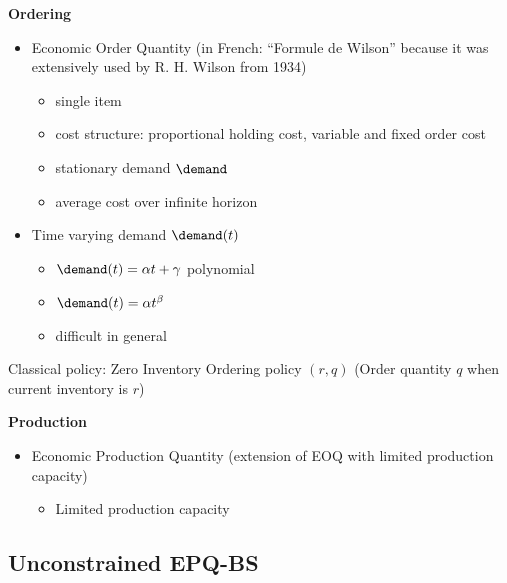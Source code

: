 \medskip

\textbf{Ordering}

\begin{itemize}
  \item \cite{Harris1913} Economic Order Quantity (in French: ``Formule de Wilson'' because it was extensively used by R. H. Wilson from 1934)
  \begin{itemize}
    \item single item
    \item cost structure: proportional holding cost, variable and fixed order cost
    \item stationary demand $\demand$
    \item average cost over infinite horizon
  \end{itemize}
  \item Time varying demand $\demand(t)$
  \begin{itemize}
    \item \cite{Resh1976,Donaldson1977} $\demand(t)=\alpha t+\gamma$ polynomial
    \item \cite{Barbosa1978} $\demand(t)=\alpha t^{\beta}$
    \item difficult in general
  \end{itemize}
\end{itemize}

Classical policy: Zero Inventory Ordering policy $(r,q)$ (Order quantity $q$ when current inventory is $r$)

\medskip

\textbf{Production}

\begin{itemize}
  \item Economic Production Quantity (extension of EOQ with limited production capacity) \cite{Taft1918}
  \begin{itemize}
    \item Limited production capacity
  \end{itemize}
\end{itemize}


\medskip




\subsection{Unconstrained EPQ-BS}
\label{sec:lot-size:single-line:models:unconstrained}


